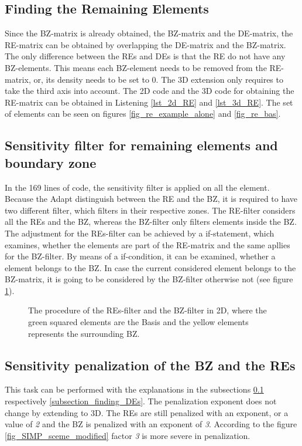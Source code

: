 \subsection{Finding the \textbf{Remaining Elements}}
\label{subsectin_find_REs}
Since the BZ-matrix is already obtained,
 the BZ-matrix and the DE-matrix, the RE-matrix can be obtained by 
 overlapping the DE-matrix and the BZ-matrix.
  The only difference between the REs and DEs is that the RE do not have any BZ-elements. This means each BZ-element needs to be removed from the RE-matrix, or, its density needs to be set to 0. The 3D  extension only requires to take the third axis into account. The 2D  code and the 3D code for obtaining the RE-matrix can be obtained in Listening \ref{lst_2d_RE} and \ref{lst_3d_RE}.
  The set of elements can be seen on figures \ref{fig_re_example_alone} and \ref{fig_re_bas}.\\

\subsection{Sensitivity filter for remaining elements and boundary zone }
\label{subsection_SF_RE_BZ}

In the 169 lines of code, the sensitivity filter is applied on all the element. Because the Adapt distinguish between the RE and the BZ, it is 
required to have two different filter, which filters in their respective zones. The
RE-filter considers all the REs and the BZ, whereas the BZ-filter only filters
elements inside the BZ.
The adjustment for the REs-filter can be achieved by a
if-statement, which examines, whether the elements are part of the RE-matrix and the same apllies for the BZ-filter.
By means of a if-condition, it can be examined, whether a element belongs to the BZ. In case the current considered element belongs to the BZ-matrix, it is going to be considered by the BZ-filter otherwise not (see figure \ref{fig_re_bz_filter}).

\begin{figure} [!h]
\centering
 \def\svgwidth{0.85\textwidth}
  
 \caption{The procedure of the REs-filter and the BZ-filter in 2D, where the green squared elements are the Basis and the yellow elements represents the surrounding BZ.}    %
 \label{fig_re_bz_filter}  
 \end{figure}
 
\subsection{Sensitivity penalization of the BZ and the REs }
This task can be performed with the explanations in the subsections \ref{subsectin_find_REs}
respectively \ref{subsection_finding_DEs}. The penalization 
exponent does not change by extending to 3D. 
The REs are still penalized with an exponent, or 
a value  of \textit{2} and the BZ is penalized with an exponent
 of \textit{3}. According to the figure \ref{fig_SIMP_sceme_modified} factor \textit{3} is more severe in penalization.








